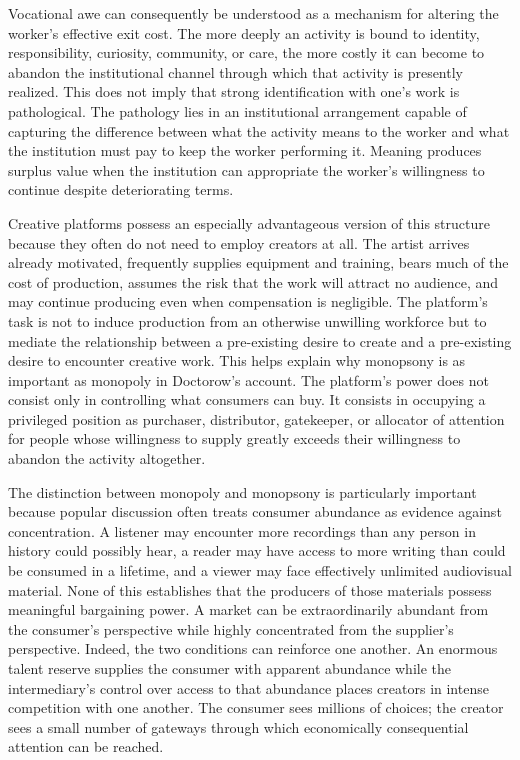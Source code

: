 \documentclass[11pt]{article}
\begin{document}
Vocational awe can consequently be understood as a mechanism for altering the worker's effective exit cost. The more deeply an activity is bound to identity, responsibility, curiosity, community, or care, the more costly it can become to abandon the institutional channel through which that activity is presently realized. This does not imply that strong identification with one's work is pathological. The pathology lies in an institutional arrangement capable of capturing the difference between what the activity means to the worker and what the institution must pay to keep the worker performing it. Meaning produces surplus value when the institution can appropriate the worker's willingness to continue despite deteriorating terms.

Creative platforms possess an especially advantageous version of this structure because they often do not need to employ creators at all. The artist arrives already motivated, frequently supplies equipment and training, bears much of the cost of production, assumes the risk that the work will attract no audience, and may continue producing even when compensation is negligible. The platform's task is not to induce production from an otherwise unwilling workforce but to mediate the relationship between a pre-existing desire to create and a pre-existing desire to encounter creative work. This helps explain why monopsony is as important as monopoly in Doctorow's account. The platform's power does not consist only in controlling what consumers can buy. It consists in occupying a privileged position as purchaser, distributor, gatekeeper, or allocator of attention for people whose willingness to supply greatly exceeds their willingness to abandon the activity altogether.

The distinction between monopoly and monopsony is particularly important because popular discussion often treats consumer abundance as evidence against concentration. A listener may encounter more recordings than any person in history could possibly hear, a reader may have access to more writing than could be consumed in a lifetime, and a viewer may face effectively unlimited audiovisual material. None of this establishes that the producers of those materials possess meaningful bargaining power. A market can be extraordinarily abundant from the consumer's perspective while highly concentrated from the supplier's perspective. Indeed, the two conditions can reinforce one another. An enormous talent reserve supplies the consumer with apparent abundance while the intermediary's control over access to that abundance places creators in intense competition with one another. The consumer sees millions of choices; the creator sees a small number of gateways through which economically consequential attention can be reached.
\end{document}
